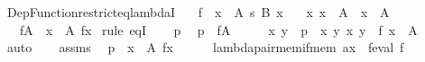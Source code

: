 \begin{isabellebody}
\isanewline
%
\endisadelimproof
\isanewline
{}\isamarkupfalse%
\ Dep{\isacharunderscore}{\kern0pt}Function{\isacharunderscore}{\kern0pt}restrict{\isacharunderscore}{\kern0pt}eq{\isacharunderscore}{\kern0pt}lambdaI{\isacharcolon}{\kern0pt}\isanewline
\ \ \ {\isachardoublequoteopen}f\ {\isacharcolon}{\kern0pt}\ {\isacharparenleft}{\kern0pt}x\ {\isacharcolon}{\kern0pt}\ A{\isacharparenright}{\kern0pt}\ {\isasymrightarrow}s\ B\ x{\isachardoublequoteclose}\isanewline
\ \ \ {\isachardoublequoteopen}{\isasymAnd}x{\isachardot}{\kern0pt}\ x\ {\isasymin}\ A{\isacharprime}{\kern0pt}\ {\isasymLongrightarrow}\ x\ {\isacharcolon}{\kern0pt}\ A{\isachardoublequoteclose}\isanewline
\ \ \ {\isachardoublequoteopen}f{\isasymrestriction}\isactrlbsub A{\isacharprime}{\kern0pt}\isactrlesub \ {\isacharequal}{\kern0pt}\ {\isacharparenleft}{\kern0pt}{\isasymlambda}x\ {\isasymin}\ A{\isacharprime}{\kern0pt}{\isachardot}{\kern0pt}\ f{\isacharbackquote}{\kern0pt}x{\isacharparenright}{\kern0pt}{\isachardoublequoteclose}\isanewline
%
\isadelimproof
%
\endisadelimproof
%
\isatagproof
{}\isamarkupfalse%
\ {\isacharparenleft}{\kern0pt}rule\ eqI{\isacharparenright}{\kern0pt}\isanewline
\ \ \isamarkupfalse%
\ p\ \isamarkupfalse%
\ {\isachardoublequoteopen}p\ {\isasymin}\ f{\isasymrestriction}\isactrlbsub A{\isacharprime}{\kern0pt}\isactrlesub {\isachardoublequoteclose}\isanewline
\ \ \isamarkupfalse%
\ \isamarkupfalse%
\ x\ y\ \ {\isachardoublequoteopen}p\ {\isacharequal}{\kern0pt}\ {\isasymlangle}x{\isacharcomma}{\kern0pt}\ y{\isasymrangle}{\isachardoublequoteclose}\ {\isachardoublequoteopen}{\isasymlangle}x{\isacharcomma}{\kern0pt}\ y{\isasymrangle}\ {\isasymin}\ f{\isachardoublequoteclose}\ {\isachardoublequoteopen}x\ {\isasymin}\ A{\isacharprime}{\kern0pt}{\isachardoublequoteclose}\ \isamarkupfalse%
\ auto\isanewline
\ \ \isamarkupfalse%
\ assms\ \isamarkupfalse%
\ {\isachardoublequoteopen}p\ {\isasymin}\ {\isasymlambda}x\ {\isasymin}\ A{\isacharprime}{\kern0pt}{\isachardot}{\kern0pt}\ f{\isacharbackquote}{\kern0pt}x{\isachardoublequoteclose}\isanewline
\ \ \ \ \isamarkupfalse%
\ lambda{\isacharunderscore}{\kern0pt}pair{\isacharunderscore}{\kern0pt}mem{\isacharunderscore}{\kern0pt}if{\isacharunderscore}{\kern0pt}mem{\isacharbrackleft}{\kern0pt}\ {\isacharquery}{\kern0pt}a{\isacharequal}{\kern0pt}x\ \ {\isacharquery}{\kern0pt}f{\isacharequal}{\kern0pt}{\isachardoublequoteopen}eval\ f{\isachardoublequoteclose}{\isacharbrackright}{\kern0pt}\ \isamarkupfalse%

\end{isabellebody}
